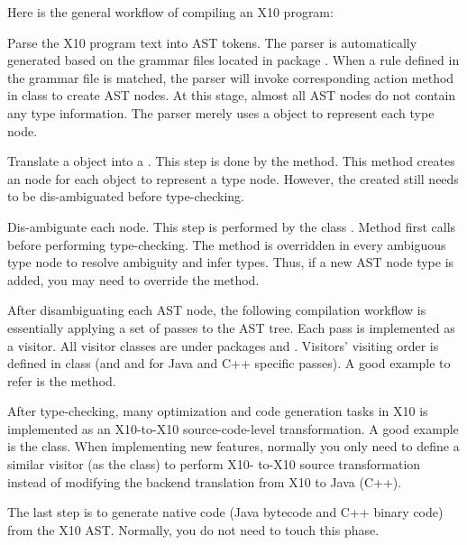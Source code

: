 \documentclass{article}
\begin{document}
Here is the general workflow of compiling an X10 program:

\begin{enumerate}

\Item Parse the X10 program text into AST tokens. The parser is automatically generated based on the grammar files located in package  . When a rule defined in the  grammar file is matched, the parser will invoke corresponding action method in class  to create AST nodes.  At this stage, almost all AST nodes do not contain any type information. The parser merely uses a  object to represent each type node.

\Item Translate a  object into a . This step is done by the  method. This method creates an  node for each  object to represent a type node. However, the created  still needs to be dis-ambiguated before type-checking.

\Item Dis-ambiguate each  node. This step is performed by the class . Method  first calls  before performing type-checking. The  method is overridden in every ambiguous type node to resolve ambiguity and infer types. Thus, if a new AST node type is added,  you may need to override the  method.

\Item After disambiguating each AST node, the following compilation workflow is essentially applying a set of passes to the AST tree. Each pass is implemented as a visitor. All visitor classes are under packages   and .  Visitors' visiting order  is defined in class  (and  and  for Java and C++ specific passes). A good example to refer is the   method.

\Item After type-checking, many optimization and code generation tasks in X10 is implemented as an X10-to-X10 source-code-level transformation. A good example is the  class. When implementing new features, normally you only need to define a similar visitor (as the  class) to perform X10- to-X10 source transformation instead of modifying the backend translation from X10 to Java (C++).

\Item The last step is to generate native code (Java bytecode and C++ binary code) from the X10 AST. Normally, you do not need to touch this phase.


\end{enumerate}
\end{document}
